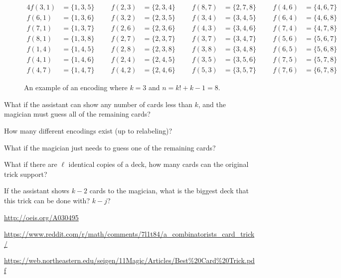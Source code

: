 \documentclass{article}
\begin{document}
\begin{figure}[!h]
\begin{alignat*}{4}
    f(3,1) &= \{1,3,5\} \hspace{1cm} f(2,3) &= \{2,3,4\} \hspace{1cm} f(8,7) &= \{2,7,8\} \hspace{1cm} f(4,6) &= \{4,6,7\}\\
    f(6,1) &= \{1,3,6\} \hspace{1cm} f(3,2) &= \{2,3,5\} \hspace{1cm} f(3,4) &= \{3,4,5\} \hspace{1cm} f(6,4) &= \{4,6,8\}\\
    f(7,1) &= \{1,3,7\} \hspace{1cm} f(2,6) &= \{2,3,6\} \hspace{1cm} f(4,3) &= \{3,4,6\} \hspace{1cm} f(7,4) &= \{4,7,8\}\\
    f(8,1) &= \{1,3,8\} \hspace{1cm} f(2,7) &= \{2,3,7\} \hspace{1cm} f(3,7) &= \{3,4,7\} \hspace{1cm} f(5,6) &= \{5,6,7\}\\
    f(1,4) &= \{1,4,5\} \hspace{1cm} f(2,8) &= \{2,3,8\} \hspace{1cm} f(3,8) &= \{3,4,8\} \hspace{1cm} f(6,5) &= \{5,6,8\}\\
    f(4,1) &= \{1,4,6\} \hspace{1cm} f(2,4) &= \{2,4,5\} \hspace{1cm} f(3,5) &= \{3,5,6\} \hspace{1cm} f(7,5) &= \{5,7,8\}\\
    f(4,7) &= \{1,4,7\} \hspace{1cm} f(4,2) &= \{2,4,6\} \hspace{1cm} f(5,3) &= \{3,5,7\} \hspace{1cm} f(7,6) &= \{6,7,8\}
  \end{alignat*}
  \caption{
    An example of an encoding where $k=3$ and $n=k!+k-1=8$.
  }
\end{figure}

\begin{question}
  What if the assistant can show any number of cards less than $k$, and the
  magician must guess all of the remaining cards?
\end{question}
\begin{related}
  \item How many different encodings exist (up to relabeling)?
  \item What if the magician just needs to guess one of the remaining cards?
  \item What if there are $\ell$ identical copies of a deck, how many cards can
    the original trick support?
  \item If the assistant shows $k-2$ cards to the magician, what is the biggest
    deck that this trick can be done with? $k-j$?
\end{related}

\begin{references}
  \item \url{http://oeis.org/A030495}
  \item \url{https://www.reddit.com/r/math/comments/7l1t84/a_combinatorists_card_trick/}
  \item \url{https://web.northeastern.edu/seigen/11Magic/Articles/Best%20Card%20Trick.pdf}
\end{references}
\end{document}
